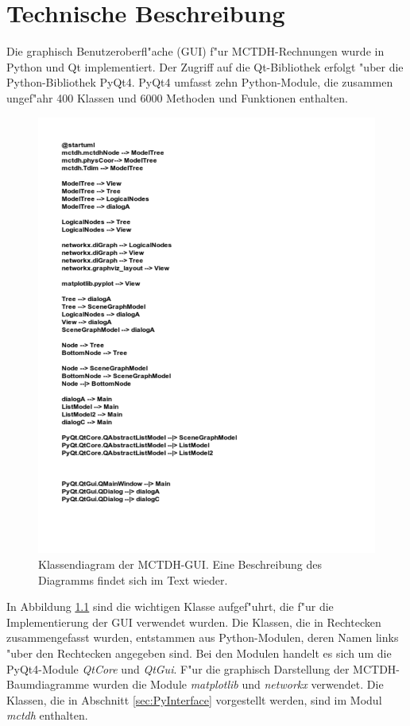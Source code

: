 \chapter{Technische Beschreibung}

 Die graphisch Benutzeroberfl"ache (GUI) f"ur MCTDH-Rechnungen wurde in Python und Qt implementiert.
 Der Zugriff auf die Qt-Bibliothek erfolgt "uber die Python-Bibliothek PyQt4. 
 PyQt4 umfasst zehn Python-Module, die zusammen ungef"ahr 400 Klassen und 6000 Methoden und Funktionen enthalten. \cite{PyQt}

 \begin{figure}
    \centering
    \vspace*{-0.5cm}\includegraphics[width=\textwidth, angle=90, scale=1.4]{figures/umlPyQt}
    \caption{Klassendiagram der MCTDH-GUI. Eine Beschreibung des Diagramms
     findet sich im Text wieder.}\label{fig:uml_PyQt}
\end{figure}

In Abbildung \ref{fig:uml_PyQt} sind die wichtigen Klasse aufgef"uhrt, die f"ur die Implementierung der GUI verwendet wurden. 
Die Klassen, die in Rechtecken zusammengefasst wurden, entstammen aus Python-Modulen, deren Namen links "uber den Rechtecken angegeben sind.
Bei den Modulen handelt es sich um die PyQt4-Module \textit{QtCore} und \textit{QtGui}. F"ur die graphisch Darstellung der MCTDH-Baumdiagramme
wurden die Module \textit{matplotlib} und \textit{networkx} verwendet. Die Klassen, die in Abschnitt \ref{sec:PyInterface} vorgestellt werden,
sind im Modul \textit{mctdh} enthalten. 

